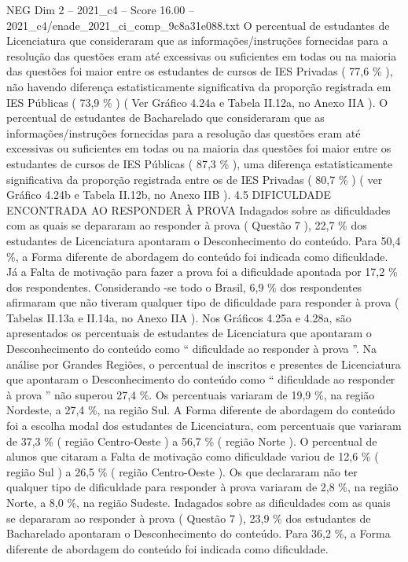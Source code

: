 \begin{textsample}{NEG Dim 2 – 2021\_c4 – Score 16.00 – 2021\_c4/enade\_2021\_ci\_comp\_9c8a31e088.txt}
O percentual de estudantes de Licenciatura que consideraram que as informações/instruções fornecidas para a resolução das questões eram até excessivas ou suficientes em todas ou na maioria das questões foi maior entre os estudantes de cursos de IES Privadas ( 77,6 \% ), não havendo diferença estatisticamente significativa da proporção registrada em IES Públicas ( 73,9 \% ) ( Ver Gráfico 4.24a e Tabela II.12a, no Anexo IIA ).
O percentual de estudantes de Bacharelado que consideraram que as informações/instruções fornecidas para a resolução das questões eram até excessivas ou suficientes em todas ou na maioria das questões foi maior entre os estudantes de cursos de IES Públicas ( 87,3 \% ), uma diferença estatisticamente significativa da proporção registrada entre os de IES Privadas ( 80,7 \% ) ( ver Gráfico 4.24b e Tabela II.12b, no Anexo IIB ). 4.5 DIFICULDADE ENCONTRADA AO RESPONDER À PROVA Indagados sobre as dificuldades com as quais se depararam ao responder à prova ( Questão 7 ), 22,7 \% dos estudantes de Licenciatura apontaram o Desconhecimento do conteúdo.
Para 50,4 \%, a Forma diferente de abordagem do conteúdo foi indicada como dificuldade.
Já a Falta de motivação para fazer a prova foi a dificuldade apontada por 17,2 \% dos respondentes.
Considerando -se todo o Brasil, 6,9 \% dos respondentes afirmaram que não tiveram qualquer tipo de dificuldade para responder à prova ( Tabelas II.13a e II.14a, no Anexo IIA ).
Nos Gráficos 4.25a e 4.28a, são apresentados os percentuais de estudantes de Licenciatura que apontaram o Desconhecimento do conteúdo como “ dificuldade ao responder à prova ”.
Na análise por Grandes Regiões, o percentual de inscritos e presentes de Licenciatura que apontaram o Desconhecimento do conteúdo como “ dificuldade ao responder à prova ” não superou 27,4 \%.
Os percentuais variaram de 19,9 \%, na região Nordeste, a 27,4 \%, na região Sul.
A Forma diferente de abordagem do conteúdo foi a escolha modal dos estudantes de Licenciatura, com percentuais que variaram de 37,3 \% ( região Centro-Oeste ) a 56,7 \% ( região Norte ).
O percentual de alunos que citaram a Falta de motivação como dificuldade variou de 12,6 \% ( região Sul ) a 26,5 \% ( região Centro-Oeste ).
Os que declararam não ter qualquer tipo de dificuldade para responder à prova variaram de 2,8 \%, na região Norte, a 8,0 \%, na região Sudeste.
Indagados sobre as dificuldades com as quais se depararam ao responder à prova ( Questão 7 ), 23,9 \% dos estudantes de Bacharelado apontaram o Desconhecimento do conteúdo.
Para 36,2 \%, a Forma diferente de abordagem do conteúdo foi indicada como dificuldade.

\end{textsample}
